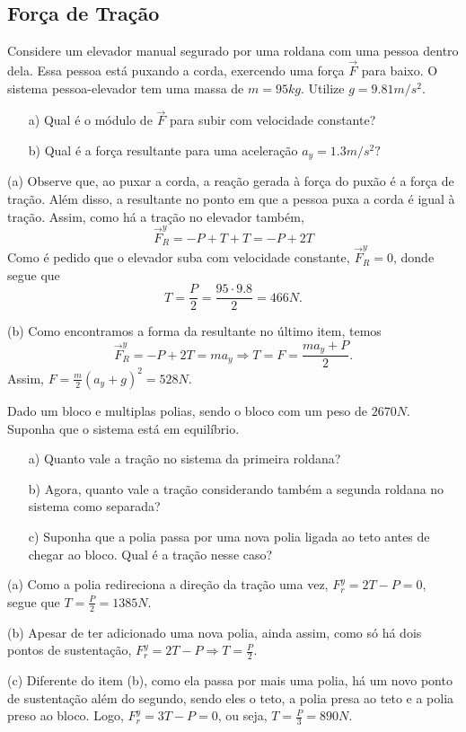 \documentclass[physics_notes.tex]{subfiles}
\begin{document}
\subsection{Força de Tração}
\begin{example}
	Considere um elevador manual segurado por uma roldana com uma pessoa dentro dela. Essa pessoa está puxando a corda, exercendo
	uma força $\vec{F}$ para baixo. O sistema pessoa-elevador tem uma massa de $m=95kg$. Utilize $g=9.81m/s^{2}$.
	\begin{itemize}
		\item[a)] Qual é o módulo de $\vec{F}$ para subir com velocidade constante?
		\item[b)] Qual é a força resultante para uma aceleração $a_{y}=1.3m/s^{2}?$
	\end{itemize}

	(a) Observe que, ao puxar a corda, a reação gerada à força do puxão é a força de tração. Além disso,
	a resultante no ponto em que a pessoa puxa a corda é igual à tração. Assim, como há a tração no elevador também,
	$$
		\vec{F}_{R}^{y}= -P + T + T = -P + 2T
	$$
	Como é pedido que o elevador suba com velocidade constante, $\vec{F}_{R}^{y} = 0$, donde segue que
	$$
		T = \frac{P}{2} = \frac{95 \cdot 9.8}{2} = 466N.
	$$

	(b) Como encontramos a forma da resultante no último item, temos
	$$
		\vec{F}_{R}^{y} = - P + 2T = ma_{y} \Rightarrow T = F = \frac{ma_{y}+P}{2}.
	$$
	Assim, $F = \frac{m}{2}(a_{y}+g)^{2} = 528N.$
\end{example}

\begin{example}
	Dado um bloco e multiplas polias, sendo o bloco com um peso de $2670N.$ Suponha que o sistema está em equilíbrio.
	\begin{itemize}
		\item[a)] Quanto vale a tração no sistema da primeira roldana?
		\item[b)] Agora, quanto vale a tração considerando também a segunda roldana no sistema como separada?
		\item[c)] Suponha que a polia passa por uma nova polia ligada ao teto antes de chegar ao bloco. Qual é a tração nesse caso?
	\end{itemize}

	(a) Como a polia redireciona a direção da tração uma vez, $F_{r}^{y} = 2T - P = 0,$ segue que $T = \frac{P}{2} = 1385N.$

	(b) Apesar de ter adicionado uma nova polia, ainda assim, como só há dois pontos de sustentação, $F_{r}^{y} = 2T - P \Rightarrow T = \frac{P}{2}.$

	(c) Diferente do item (b), como ela passa por mais uma polia, há um novo ponto de sustentação além do segundo, sendo eles
	o teto, a polia presa ao teto e a polia preso ao bloco. Logo, $F_{r}^{y} = 3T - P = 0$, ou seja, $T = \frac{P}{3} = 890N.$
\end{example}
\end{document}

